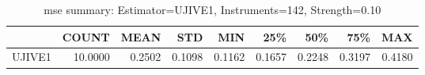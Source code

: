 \begin{table}[ht]
\centering
\caption{mse summary: Estimator=UJIVE1, Instruments=142, Strength=0.10}
\begin{tabular}{lrrrrrrrr}
\toprule
 & COUNT & MEAN & STD & MIN & 25\% & 50\% & 75\% & MAX \\
\midrule
UJIVE1 & 10.0000 & 0.2502 & 0.1098 & 0.1162 & 0.1657 & 0.2248 & 0.3197 & 0.4180 \\
\bottomrule
\end{tabular}
\end{table}
